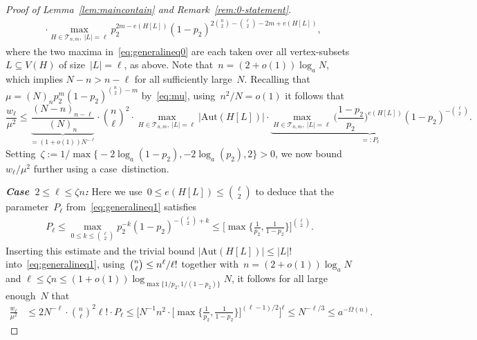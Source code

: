\documentclass{article}
\newcommand{\cT}{\mathcal{T}}
\newcommand{\epsp}{\zeta} \newcommand{\polylog}{\mathrm{polylog}}
\newcommand\abs[1]{\left|#1\right|}
\newcommand{\Aut}{\mathrm{Aut}}
\newcommand{\w}{w}
\newcommand\biggpar[1]{\biggl(#1\biggr)}
\newcommand\biggsqpar[1]{\biggl[#1\biggr]}
\newcommand\Biggsqpar[1]{\Biggl[#1\Biggr]}
\newcommand\bigcpar[1]{\bigl\{#1\bigr\}}
\newcommand\biggcpar[1]{\biggl\{#1\biggr\}}
\newcommand{\refL}[1]{Lemma~\ref{#1}}
\begin{document}
\begin{proof}[Proof of \refL{lem:maincontain} and Remark~\ref{rem:0-statement}]
\begin{equation}
\begin{split}
	& \cdot \max_{H\in\cT_{n,m}, \: \abs{L}=\ell} p_2^{2m-e(H[L])} (1-p_2)^{2\binom{n}{2}-\binom{\ell}{2}-2m+e(H[L])} ,
\end{split}
\end{equation}
where the two maxima in~\eqref{eq:generalineq0} are each taken over all vertex-subsets $L \subseteq V(H)$ of size~$|L|=\ell$, as above. 
Note that~${n = (2+o(1))\log_a N}$, which implies $N-n > n-\ell$ for all sufficiently large~$N$. Recalling that $\mu = (N)_n p_2^m(1-p_2)^{\binom{n}{2}-m}$ by~\eqref{eq:mu}, using~$n^2/N = o(1)$ it follows that 
\begin{equation}\label{eq:generalineq1}
\frac{\w_\ell}{\mu^2} \leq
\underbrace{\frac{(N-n)_{n-\ell}}{(N)_n}}_{=(1+o(1))N^{-\ell}} \cdot  \binom{n}{\ell}^2 \cdot\max_{H \in \cT_{n,m}, \: \abs{L} = \ell}\abs{\Aut(H[L])} \cdot 
\underbrace{\max_{H\in \cT_{n,m}, \: \abs{L}=\ell} 
\biggpar{\frac{1-p_2}{p_2}}^{e(H[L])}(1-p_2)^{-\binom{\ell}{2}}}_{=:P_{\ell}}.
\end{equation}
Setting~$\epsp := 1/\max\bigcpar{-2\log_a(1-p_2),-2\log_a(p_2),2} >  0$, 
we now bound~$\w_\ell/\mu^2$ further using a case~distinction. 

\textit{\bf Case~$2\le \ell\le \epsp n$:} 
Here we use~$0 \leq e(H[L]) \leq \binom{\ell}{2}$ to deduce that the parameter~$P_\ell$ from~\eqref{eq:generalineq1} satisfies 
\begin{align}\label{eq:case1contain}
P_{\ell} \le \max_{0 \le k \le \binom{\ell}{2}} p_2^{-k}(1-p_2)^{-\binom{\ell}{2}+k} \le \biggsqpar{\max\biggcpar{\frac{1}{p_2},\frac{1}{1-p_2}}}^{\binom{\ell}{2}} .
\end{align}
Inserting this estimate and the trivial bound $ |\Aut(H[L])|\le |L|!$ into~\eqref{eq:generalineq1}, 
using~$\tbinom{n}{\ell} \le n^\ell/\ell!$ 
together with~$n = (2+o(1))\log_a N$ and $\ell \le \epsp n \le  (1+o(1))\log_{\max\{1/p_2,1/(1-p_2)\}} N$,
it follows for all  large enough~$N$ that 
\begin{equation}\label{eq:generalineq:case1}
\begin{split}
	\frac{\w_\ell}{\mu^2} &\leq 2N^{-\ell} \cdot \binom{n}{\ell}^2 \ell! \cdot P_{\ell} 
\leq \Biggsqpar{N^{-1}n^{2} \cdot \biggsqpar{\max\biggcpar{\frac{1}{p_2},\frac{1}{1-p_2}}}^{(\ell-1)/2}}^{\ell} 
	\le N^{-\ell/3} \le a^{-\Omega(n)}.
\end{split}
\end{equation}


\end{proof}
\end{document}
